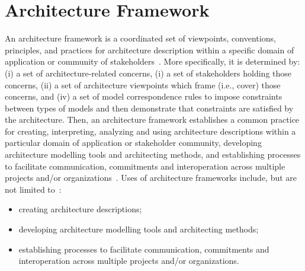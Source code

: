 \section{Architecture Framework}\label{sec:AAF}



An architecture framework is a
coordinated set of viewpoints, conventions, principles, and practices
for architecture description within a specific domain of application
or community of stakeholders~\cite{42010}.  More specifically, it is determined by: (i) a set of architecture-related concerns,
(i) a set of stakeholders holding those concerns, (ii) a set of architecture viewpoints which frame (i.e.,
cover) those concerns, and (iv) a set of model correspondence rules to impose constraints between
types of models and then demonstrate that constraints
are satisfied by the architecture. 
Then, an architecture framework establishes a common practice for creating, interpreting, analyzing and using architecture descriptions within a particular domain of application or stakeholder community, developing
architecture modelling tools and architecting methods, and establishing processes to facilitate communication, commitments and interoperation across multiple projects and/or organizations~\cite{42010}. 
Uses of architecture frameworks include, but are not limited to~\cite{42010}: 

\begin{itemize}
\item creating architecture descriptions; 
\item developing
architecture modelling tools and architecting methods; 
\item establishing processes to facilitate communication, commitments and interoperation across multiple projects and/or organizations.
\end{itemize}

